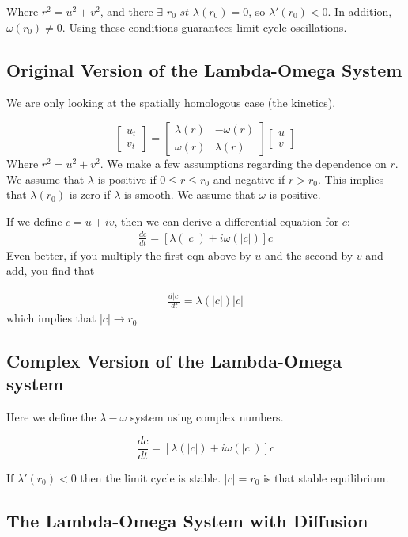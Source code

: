 \documentclass[]{article}
\numberwithin{equation}{section}		%
\def\bea{\begin{eqnarray}}
\def\ena{\end{eqnarray}}
\def\dt#1{\frac{d#1}{dt}{}}
\begin{document}
\noindent Where $r^2=u^2+v^2$, and there $\exists$ $r_0$ $st$ $\lambda(r_0)=0$, so $\lambda'(r_0)<0$.  In addition, $\omega(r_0)\neq 0$.
Using these conditions guarantees limit cycle oscillations.

\subsection{Original Version of the Lambda-Omega System}
We are only looking at the spatially homologous case (the kinetics).

$$\begin{bmatrix}
u_t \\
v_t
\end{bmatrix} =
 \begin{bmatrix}
\lambda(r) & -\omega(r) \\
\omega(r) & \lambda(r)
\end{bmatrix}
\begin{bmatrix}
u \\
v
\end{bmatrix}$$
Where $r^2=u^2+v^2$.
We make a few assumptions regarding the dependence on $r$. We assume that $\lambda$ is positive if $0\leq r \leq r_0$ and negative if $r>r_0$. This implies that $\lambda(r_0)$ is zero if $\lambda$ is smooth. We assume that $\omega$ is positive.

If we define $c=u+iv$, then we can derive a differential equation for $c$:
\bea
\dt{c} = [\lambda(|c|) + i \omega(|c|)]c\nonumber
\ena
 Even better, if you multiply the first eqn above by $u$ and the second by $v$ and add, you find that
 
 \bea
 \dt{|c|}=\lambda(|c|)|c|
 \ena which implies that $|c| \rightarrow r_0$
\noindent 


\subsection{Complex Version of the Lambda-Omega system}

Here we define the $\lambda-\omega$ system using complex numbers.

$$\frac{dc}{dt}=[\lambda(|c|)+i\omega(|c|)]c$$

\noindent If $\lambda'(r_0)<0$ then the limit cycle is stable. $|c|=r_0$ is that stable equilibrium.

\subsection{The Lambda-Omega System with Diffusion}
\end{document}
